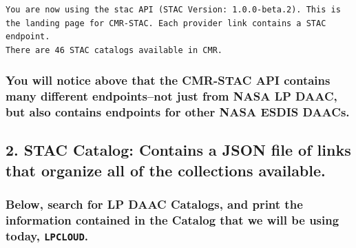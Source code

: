 \documentclass[
  letterpaper,
]{scrartcl}
\begin{document}
\begin{verbatim}
You are now using the stac API (STAC Version: 1.0.0-beta.2). This is the landing page for CMR-STAC. Each provider link contains a STAC endpoint.
There are 46 STAC catalogs available in CMR.
\end{verbatim}

\hypertarget{you-will-notice-above-that-the-cmr-stac-api-contains-many-different-endpointsnot-just-from-nasa-lp-daac-but-also-contains-endpoints-for-other-nasa-esdis-daacs.}{%
\subsubsection{You will notice above that the CMR-STAC API contains many
different endpoints--not just from NASA LP DAAC, but also contains
endpoints for other NASA ESDIS
DAACs.}\label{you-will-notice-above-that-the-cmr-stac-api-contains-many-different-endpointsnot-just-from-nasa-lp-daac-but-also-contains-endpoints-for-other-nasa-esdis-daacs.}}

\hypertarget{stac-catalog-contains-a-json-file-of-links-that-organize-all-of-the-collections-available.}{%
\subsection{2. STAC Catalog: Contains a JSON file of links that organize
all of the collections
available.}\label{stac-catalog-contains-a-json-file-of-links-that-organize-all-of-the-collections-available.}}

\hypertarget{below-search-for-lp-daac-catalogs-and-print-the-information-contained-in-the-catalog-that-we-will-be-using-today-lpcloud.}{%
\subsubsection{\texorpdfstring{Below, search for LP DAAC Catalogs, and
print the information contained in the Catalog that we will be using
today,
\texttt{LPCLOUD}.}{Below, search for LP DAAC Catalogs, and print the information contained in the Catalog that we will be using today, LPCLOUD.}}\label{below-search-for-lp-daac-catalogs-and-print-the-information-contained-in-the-catalog-that-we-will-be-using-today-lpcloud.}}
\end{document}
